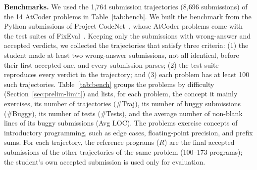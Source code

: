 \documentclass[10pt,conference]{IEEEtran}
\begin{document}
\textbf{Benchmarks.} We used the 1,764 submission trajectories (8,696 submissions) of the 14 AtCoder problems in Table~\ref{tab:bench}. We built the benchmark from the Python submissions of Project CodeNet~\cite{puri2021codenet}, whose AtCoder problems come with the test suites of FixEval~\cite{haque2023fixeval}. Keeping only the submissions with wrong-answer and accepted verdicts, we collected the trajectories that satisfy three criteria: (1) the student made at least two wrong-answer submissions, not all identical, before their first accepted one, and every submission parses; (2) the test suite reproduces every verdict in the trajectory; and (3) each problem has at least 100 such trajectories. Table~\ref{tab:bench} groups the problems by difficulty (Section~\ref{sec:prelim-limit}) and lists, for each problem, the concept it mainly exercises, its number of trajectories (\#Traj), its number of buggy submissions (\#Buggy), its number of tests (\#Tests), and the average number of non-blank lines of its buggy submissions (Avg LOC). The problems exercise concepts of introductory programming, such as edge cases, floating-point precision, and prefix sums. For each trajectory, the reference programs ($R$) are the final accepted submissions of the other trajectories of the same problem (100--173 programs); the student's own accepted submission is used only for evaluation.
\end{document}
